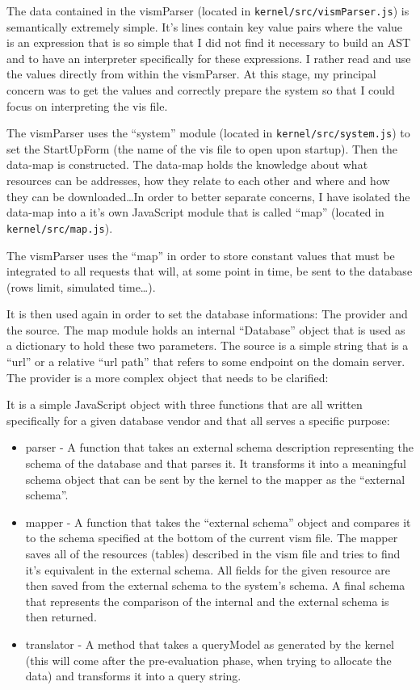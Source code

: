 The data contained in the vismParser (located in \texttt{kernel/src/vismParser.js}) is semantically extremely simple. It's lines contain key value pairs where the value is an expression that is so simple that I did not find it necessary to build an AST and to have an interpreter specifically for these expressions. I rather read and use the values directly from within the vismParser. At this stage, my principal concern was to get the values and correctly prepare the system so that I could focus on interpreting the vis file.

The vismParser uses the ``system'' module (located in \texttt{kernel/src/system.js}) to set the StartUpForm (the name of the vis file to open upon startup). Then the data-map is constructed. The data-map holds the knowledge about what resources can be addresses, how they relate to each other and where and how they can be downloaded\dots In order to better separate concerns, I have isolated the data-map into a it's own JavaScript module that is called ``map'' (located in \texttt{kernel/src/map.js}). 

The vismParser uses the ``map'' in order to store constant values that must be integrated to all requests that will, at some point in time, be sent to the database (rows limit, simulated time\dots).

It is then used again in order to set the database informations: The provider and the source. The map module holds an internal ``Database'' object that is used as a dictionary to hold these two parameters. The source is a simple string that is a ``url'' or a relative ``url path'' that refers to some endpoint on the domain server. The provider is a more complex object that needs to be clarified:

It is a simple JavaScript object with three functions that are all written specifically for a given database vendor and that all serves a specific purpose:
\begin{itemize}
    \item parser - A function that takes an external schema description representing the schema of the database and that parses it. It transforms it into a meaningful schema object that can be sent by the kernel to the mapper as the ``external schema''. 
    \item mapper - A function that takes the ``external schema'' object and compares it to the schema specified at the bottom of the current vism file. The mapper saves all of the resources (tables) described in the vism file and tries to find it's equivalent in the external schema. All fields for the given resource are then saved from the external schema to the system's schema. A final schema that represents the comparison of the internal and the external schema is then returned.
    \item translator - A method that takes a queryModel as generated by the kernel (this will come after the pre-evaluation phase, when trying to allocate the data) and transforms it into a query string.
\end{itemize}

